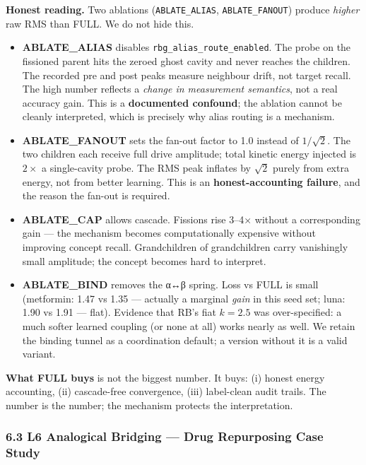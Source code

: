 \documentclass[
  11pt,
  a4paper,
]{article}
\providecommand{\tightlist}{%
  \setlength{\itemsep}{0pt}\setlength{\parskip}{0pt}}
\begin{document}
\textbf{Honest reading.} Two ablations (\texttt{ABLATE\_ALIAS},
\texttt{ABLATE\_FANOUT}) produce \emph{higher} raw RMS than FULL. We do
not hide this.

\begin{itemize}
\tightlist
\item
  \textbf{ABLATE\_ALIAS} disables \texttt{rbg\_alias\_route\_enabled}.
  The probe on the fissioned parent hits the zeroed ghost cavity and
  never reaches the children. The recorded pre and post peaks measure
  neighbour drift, not target recall. The high number reflects a
  \emph{change in measurement semantics}, not a real accuracy gain. This
  is a \textbf{documented confound}; the ablation cannot be cleanly
  interpreted, which is precisely why alias routing is a mechanism.
\item
  \textbf{ABLATE\_FANOUT} sets the fan-out factor to 1.0 instead of
  \(1/\sqrt{2}\). The two children each receive full drive amplitude;
  total kinetic energy injected is \(2\times\) a single-cavity probe.
  The RMS peak inflates by \(\sqrt{2}\) purely from extra energy, not
  from better learning. This is an \textbf{honest-accounting failure},
  and the reason the fan-out is required.
\item
  \textbf{ABLATE\_CAP} allows cascade. Fissions rise 3--4× without a
  corresponding gain --- the mechanism becomes computationally expensive
  without improving concept recall. Grandchildren of grandchildren carry
  vanishingly small amplitude; the concept becomes hard to interpret.
\item
  \textbf{ABLATE\_BIND} removes the α↔β spring. Loss vs FULL is small
  (metformin: 1.47 vs 1.35 --- actually a marginal \emph{gain} in this
  seed set; luna: 1.90 vs 1.91 --- flat). Evidence that RB's fiat
  \(k=2.5\) was over-specified: a much softer learned coupling (or none
  at all) works nearly as well. We retain the binding tunnel as a
  coordination default; a version without it is a valid variant.
\end{itemize}

\textbf{What FULL buys} is not the biggest number. It buys: (i) honest
energy accounting, (ii) cascade-free convergence, (iii) label-clean
audit trails. The number is the number; the mechanism protects the
interpretation.

\subsubsection{6.3 L6 Analogical Bridging --- Drug Repurposing Case
Study}\label{l6-analogical-bridging-drug-repurposing-case-study}
\end{document}
